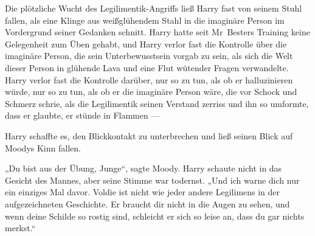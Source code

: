 Die plötzliche Wucht des Legilimentik-Angriffs ließ Harry fast von seinem Stuhl fallen, als eine Klinge aus weißglühendem Stahl in die imaginäre Person im Vordergrund seiner Gedanken schnitt. Harry hatte seit Mr~Besters Training keine Gelegenheit zum Üben gehabt, und Harry verlor fast die Kontrolle über die imaginäre Person, die sein Unterbewusstsein vorgab zu sein, als sich die Welt dieser Person in glühende Lava und eine Flut wütender Fragen verwandelte. Harry verlor fast die Kontrolle darüber, nur so zu tun, als ob er halluzinieren würde, nur so zu tun, als ob er die imaginäre Person wäre, die vor Schock und Schmerz schrie, als die Legilimentik seinen Verstand zerriss und ihn so umformte, dass er glaubte, er stünde in Flammen —

Harry schaffte es, den Blickkontakt zu unterbrechen und ließ seinen Blick auf Moodys Kinn fallen.

„Du bist aus der Übung, Junge“, sagte Moody.
Harry schaute nicht in das Gesicht des Mannes, aber seine Stimme war todernst.
„Und ich warne dich nur ein einziges Mal davor. Voldie ist nicht wie jeder andere Legilimens in der aufgezeichneten Geschichte. Er braucht dir nicht in die Augen zu sehen, und wenn deine Schilde so rostig sind, schleicht er sich so leise an, dass du gar nichts merkst.“


